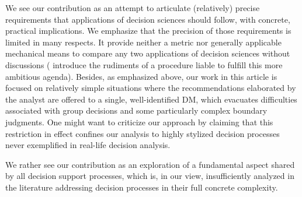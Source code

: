 \documentclass[preprint, french, english, 11pt, authoryear]{elsarticle}%
\begin{document}
We see our contribution as an attempt to articulate (relatively) precise requirements that applications of decision sciences should follow, with concrete, practical implications. We emphasize that the precision of those requirements is limited in many respects.
It provide neither a metric nor generally applicable mechanical means to compare any two applications of decision sciences without discussions (\citet{cailloux_formal_2018} introduce the rudiments of a procedure liable to fulfill this more ambitious agenda).
Besides, as emphasized above, our work in this article is focused on relatively simple situations where the recommendations elaborated by the analyst are offered to a single, well-identified \ac{DM}, which evacuates difficulties associated with group decisions and some particularly complex boundary judgments.
One might want to criticize our approach by claiming that this restriction in effect confines our analysis to highly stylized decision processes never exemplified in real-life decision analysis.
\begin{changebar}We rather see our contribution as an exploration of a fundamental aspect shared by all decision support processes, which is, in our view, insufficiently analyzed in the literature addressing decision processes in their full concrete complexity.\end{changebar}
\end{document}
